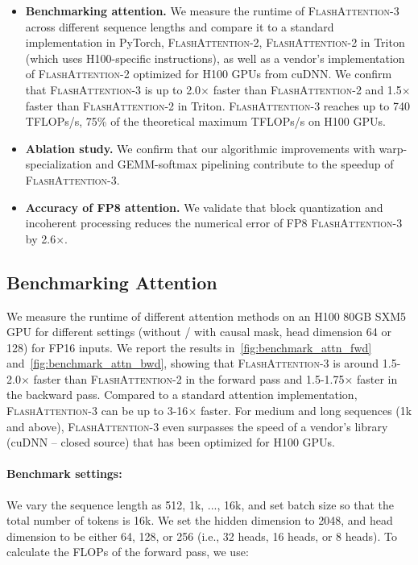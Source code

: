\begin{itemize}

\item \textbf{Benchmarking attention.} We measure the runtime of \textsc{FlashAttention-3} across different sequence lengths and compare it to a standard implementation in PyTorch,
\textsc{FlashAttention-2}, \textsc{FlashAttention-2} in Triton (which uses H100-specific instructions), as well as a vendor's implementation of \textsc{FlashAttention-2} optimized for H100 GPUs from cuDNN. We confirm that \textsc{FlashAttention-3} is up to 2.0$\times$ faster than \textsc{FlashAttention-2} and 1.5$\times$
faster than \textsc{FlashAttention-2} in Triton.
\textsc{FlashAttention-3} reaches up to 740 TFLOPs/s, 75\% of the theoretical maximum TFLOPs/s on H100 GPUs.
\item \textbf{Ablation study.} We confirm that our algorithmic improvements with warp-specialization and GEMM-softmax pipelining contribute to the speedup of \textsc{FlashAttention-3}.
\item \textbf{Accuracy of FP8 attention.} We validate that block quantization and incoherent processing reduces the numerical error of FP8 \textsc{FlashAttention-3} by 2.6$\times$.
\end{itemize}

\subsection{Benchmarking Attention}
\label{subsec:benchmark_attn}

We measure the runtime of different attention methods on an H100 80GB SXM5 GPU for different settings (without / with causal mask, head dimension 64 or 128) for FP16 inputs. We report the results
in~\cref{fig:benchmark_attn_fwd} and~\cref{fig:benchmark_attn_bwd}, showing that \textsc{FlashAttention-3} is around 1.5-2.0$\times$ faster than \textsc{FlashAttention-2} in the forward pass and 1.5-1.75$\times$ faster in the backward pass. Compared to a standard attention implementation, \textsc{FlashAttention-3} can be up to 3-16$\times$ faster. For medium and long sequences (1k and above), \textsc{FlashAttention-3} even surpasses the speed of a vendor's library (cuDNN -- closed source) that has been optimized for H100 GPUs.

\paragraph{Benchmark settings:} We vary the sequence length as 512, 1k, ..., 16k, and set batch size so that the total number of tokens is 16k. We set the hidden dimension to 2048, and head dimension to be either 64, 128, or 256 (i.e., 32 heads, 16 heads, or 8 heads). To calculate the FLOPs of the forward pass, we use:


